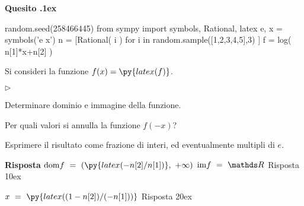 \documentclass[11pt,twoside,a4paper]{article}
\newcommand{\mylabel}[1]{#1\hfill}
\renewenvironment{itemize}
  {\begin{list}{$\triangleright$}{%
   \setlength{\parskip}{0mm}
   \setlength{\topsep}{.4\baselineskip}
   \setlength{\rightmargin}{0mm}
   \setlength{\listparindent}{0mm}
   \setlength{\itemindent}{0mm}
   \setlength{\labelwidth}{2ex}
   \setlength{\itemsep}{.4\baselineskip}
   \setlength{\parsep}{0mm}
   \setlength{\partopsep}{0mm}
   \setlength{\labelsep}{1ex}
   \setlength{\leftmargin}{\labelwidth+\labelsep}
   \let\makelabel\mylabel}}{%
   \end{list}\vspace*{-1.3mm}}
\newcounter{quesito}
\newenvironment{question}{\addtocounter{quesito}{1}\par\textbf{Quesito \thequesito.\kern1ex}}{\vspace{0.5\parskip}}
\newenvironment{answer}{\par\textbf{Risposta\quad}}{\vspace{\parskip}}
\begin{document}
\begin{question}
\def\RR{{\mathds R}}
\def\dom{{\rm dom}}
\def\range{{\rm im}}
\begin{pycode}
random.seed(258466445)
from sympy import symbols, Rational, latex
e, x = symbols('e x')
n = [Rational( i ) for i in random.sample([1,2,3,4,5],3) ]
f = log( n[1]*x+n[2] )
\end{pycode}
Si consideri la funzione $f(x) = \py{ latex(f) } $.
\begin{itemize}
\item[1.] Determinare dominio e immagine della funzione. 
\item[2.] Per quali valori si annulla la funzione $f(-x)$?
\end{itemize}
Esprimere il risultato come frazione di interi, ed eventualmente multipli di $e$.
\begin{answer}
{\color{blue}
$\displaystyle\dom f\ =\ \left(\py{latex(-n[2]/n[1])},\ +\infty\right)$
\qquad 
$\range f\ =\ \RR$
\hfill Risposta 1\kern0ex}

{\color{blue}
$\displaystyle x\ =\ \py{latex((1-n[2])/(-n[1]))}$
\hfill Risposta 2\kern0ex}

\end{answer}
\end{question}
\end{document}

